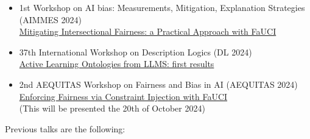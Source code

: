 \documentclass[11pt]{article}
\begin{document}
\begin{itemize}
	\item 1st Workshop on AI bias: Measurements, Mitigation, Explanation Strategies (AIMMES 2024)
	\\\href{https://apice.unibo.it/xwiki/bin/view/Talk/IntersectionalityAimmes2024}{Mitigating Intersectional Fairness: a Practical Approach with FaUCI}
	\item 37th International Workshop on Description Logics (DL 2024)
	\\\href{https://dl2024.w.uib.no/overview/}{Active Learning Ontologies from LLMS: first results}
	\item 2nd AEQUITAS Workshop on Fairness and Bias in AI (AEQUITAS 2024)
	\\\href{https://aequitas-aod.github.io/aequitas-ecai24.github.io/}{Enforcing Fairness via Constraint Injection with FaUCI}
	\\(This will be presented the 20th of October 2024)
\end{itemize}
%
Previous talks are the following:
%
\end{document}
